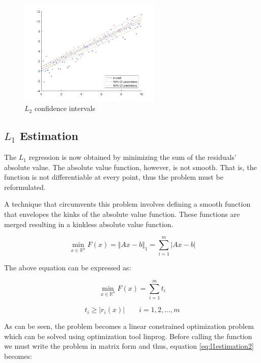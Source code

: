 \begin{figure}[htb]
\centering
\includegraphics[width=0.6\textwidth]{../img/L2_CI}
\caption{$L_2$ confidence intervals}
\label{fig:leastSquaresCI}
\end{figure}

\newpage 
\subsection{$L_1$ Estimation}

The $L_1$ regression is now obtained by minimizing the sum of the residuals' absolute value. The absolute value function, however, is not smooth. That is, the function is not differentiable at every point, thus the problem must be reformulated. 

A technique that circumvents this problem involves defining a smooth function that envelopes the kinks of the absolute value function. These functions are merged resulting in a kinkless absolute value function. 

\begin{equation}
\min\limits_{x \in \mathbb{R}^n} F(x) =  \Vert A x - b \Vert_1 =  \sum_{i=1}^{m} \vert A x - b \vert
\label{eq:l1estimation}
\end{equation}

The above equation can be expressed as:


\begin{equation}
\min\limits_{x \in \mathbb{R}^n} F(x) =\sum_{i=1}^{m} t_i
\label{eq:l1estimation2}
\end{equation}

\[
t_i \geq \vert{r_i(x)}\vert \qquad i = 1,2,...,m
\]


As can be seen, the problem becomes a linear constrained optimization problem which can be solved using \matlab optimization tool linprog. Before calling the function we must write the problem in matrix form and thus, equation \ref{eq:l1estimation2} becomes:

